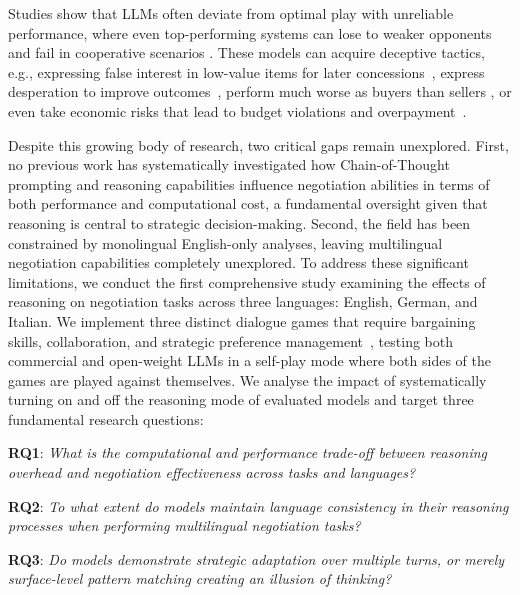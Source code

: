 \documentclass[11pt]{article}
\begin{document}
Studies show that LLMs often deviate from optimal play with unreliable performance, where even top-performing systems can lose to weaker opponents and fail in cooperative scenarios \cite{DBLP:conf/iclr/DavidsonVK024,DBLP:journals/corr/abs-2411-05990,DBLP:conf/icml/0001CYTJ024,DBLP:conf/emnlp/KwonWKCLG24}. These models can acquire deceptive tactics, e.g., expressing false interest in low-value items for later concessions~\cite{lewis-etal-2017-deal}, express desperation to improve outcomes~\cite{DBLP:conf/icml/0001CYTJ024},  perform much worse as buyers than sellers \cite{DBLP:conf/acl/Xia0RMZ0024}, or even take economic risks that lead to budget violations and overpayment~\cite{DBLP:journals/corr/abs-2506-00073}. 


Despite this growing body of research, two critical gaps remain unexplored. First, no previous work has systematically investigated how Chain-of-Thought prompting and reasoning capabilities influence negotiation abilities in terms of both performance and computational cost, a fundamental oversight given that reasoning is central to strategic decision-making. Second, the field has been constrained by monolingual English-only analyses, leaving multilingual negotiation capabilities completely unexplored. To address these significant limitations, we conduct the first comprehensive study examining the effects of reasoning on negotiation tasks across three languages: English, German, and Italian. We implement three distinct dialogue games that require bargaining skills, collaboration, and strategic preference management~\cite{VonNeumann+Morgenstern:1944,nash1953two,fisher_getting_2011}, testing both commercial and open-weight LLMs in a self-play mode where both sides of the games are played against themselves. We analyse the impact of systematically turning on and off the reasoning mode of evaluated models and target three fundamental research questions: 

\noindent\textbf{RQ1}: \textit{What is the computational and performance trade-off between reasoning overhead and negotiation effectiveness across tasks and languages?}

\noindent\textbf{RQ2}: \textit{To what extent do models maintain language consistency in their reasoning processes when performing multilingual negotiation tasks?}

\noindent\textbf{RQ3}: \textit{Do models demonstrate strategic adaptation over multiple turns, or merely surface-level pattern matching creating an illusion of thinking?}
\end{document}
